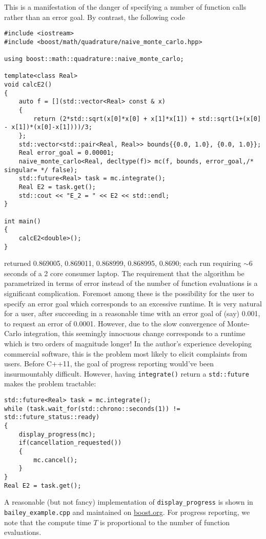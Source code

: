 \documentclass{ansarticle}
\begin{document}
This is a manifestation of the danger of specifying a number of function calls rather than an error goal.
By contrast, the following code
\begin{verbatim}
#include <iostream>
#include <boost/math/quadrature/naive_monte_carlo.hpp>

using boost::math::quadrature::naive_monte_carlo;

template<class Real>
void calcE2()
{
    auto f = [](std::vector<Real> const & x)
    {
        return (2*std::sqrt(x[0]*x[0] + x[1]*x[1]) + std::sqrt(1+(x[0] - x[1])*(x[0]-x[1])))/3;
    };
    std::vector<std::pair<Real, Real>> bounds{{0.0, 1.0}, {0.0, 1.0}};
    Real error_goal = 0.00001;
    naive_monte_carlo<Real, decltype(f)> mc(f, bounds, error_goal,/* singular= */ false);
    std::future<Real> task = mc.integrate();
    Real E2 = task.get();
    std::cout << "E_2 = " << E2 << std::endl;
}

int main()
{
    calcE2<double>();
}
\end{verbatim}
returned 0.869005, 0.869011, 0.868999, 0.868995, 0.8690; each run requiring ${\sim}6$ seconds of a 2 core consumer laptop.
The requirement that the algorithm be parametrized in terms of error instead of the number of function evaluations is a significant complication.
Foremost among these is the possibility for the user to specify an error goal which corresponds to an excessive runtime.
It is very natural for a user, after succeeding in a reasonable time with an error goal of (say) 0.001, to request an error of 0.0001.
However, due to the slow convergence of Monte-Carlo integration, this seemingly innocuous change corresponds to a runtime which is two orders of magnitude longer!
In the author's experience developing commercial software, this is the problem most likely to elicit complaints from users.
Before C++11, the goal of progress reporting would've been insurmountably difficult.
However, having \texttt{integrate()} return a \texttt{std::future} makes the problem tractable:
\begin{verbatim}
std::future<Real> task = mc.integrate();
while (task.wait_for(std::chrono::seconds(1)) != std::future_status::ready)
{
    display_progress(mc);
    if(cancellation_requested())
    {
        mc.cancel();
    }
}
Real E2 = task.get();
\end{verbatim}
A reasonable (but not fancy) implementation of \texttt{display_progress} is shown in \texttt{bailey_example.cpp} and maintained on \href{http://www.boost.org}{boost.org}.
For progress reporting, we note that the compute time $T$ is proportional to the number of function evaluations.
\end{document}
